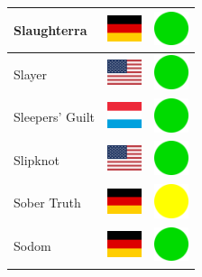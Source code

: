 \documentclass[12pt, a4paper, twoside]{report}
\begin{document}
\begin{center}
\begin{longtable}{|p{5cm}|p{2cm}|p{2cm}|}
Slaughterra & \includegraphics[width=1cm]{4x3/de} & \includegraphics[width=1cm]{likes/y} \\ \hline
Slayer & \includegraphics[width=1cm]{4x3/us} & \includegraphics[width=1cm]{likes/y} \\ \hline
Sleepers' Guilt & \includegraphics[width=1cm]{4x3/lu} & \includegraphics[width=1cm]{likes/y} \\ \hline
Slipknot & \includegraphics[width=1cm]{4x3/us} & \includegraphics[width=1cm]{likes/y} \\ \hline
Sober Truth & \includegraphics[width=1cm]{4x3/de} & \includegraphics[width=1cm]{likes/m} \\ \hline
Sodom & \includegraphics[width=1cm]{4x3/de} & \includegraphics[width=1cm]{likes/y} \\ \hline

\end{longtable}
\end{center}
\end{document}
